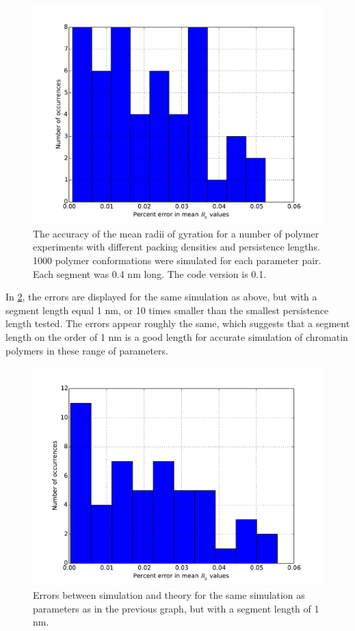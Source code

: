 \documentclass[11pt]{article}
\begin{document}
\begin{figure}[htb]
\centering
\includegraphics[width=.9\linewidth]{./images/accuracy1.pdf}
\caption{\label{fig-accuracy1}The accuracy of the mean radii of gyration for a number of polymer experiments with different packing densities and persistence lengths. 1000 polymer conformations were simulated for each parameter pair. Each segment was 0.4 nm long. The code version is 0.1.}
\end{figure}

In \ref{fig-accuracy2}, the errors are displayed for the same
simulation as above, but with a segment length equal 1 nm, or 10 times
smaller than the smallest persistence length tested. The errors appear
roughly the same, which suggests that a segment length on the order of
1 nm is a good length for accurate simulation of chromatin polymers in
these range of parameters.

\begin{figure}[htb]
\centering
\includegraphics[width=.9\linewidth]{./images/accuracy2.pdf}
\caption{\label{fig-accuracy2}Errors between simulation and theory for the same simulation as parameters as in the previous graph, but with a segment length of 1 nm.}
\end{figure}
\end{document}
